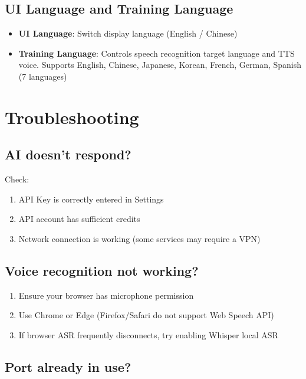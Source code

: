 \documentclass[12pt,a4paper]{article}
\begin{document}
\subsection{UI Language and Training Language}

\begin{itemize}[leftmargin=*]
  \item \textbf{UI Language}: Switch display language (English / Chinese)
  \item \textbf{Training Language}: Controls speech recognition target language and TTS voice. Supports English, Chinese, Japanese, Korean, French, German, Spanish (7 languages)
\end{itemize}

\newpage

\section{Troubleshooting}

\subsection{AI doesn't respond?}

Check:
\begin{enumerate}[leftmargin=*]
  \item API Key is correctly entered in Settings
  \item API account has sufficient credits
  \item Network connection is working (some services may require a VPN)
\end{enumerate}

\subsection{Voice recognition not working?}

\begin{enumerate}[leftmargin=*]
  \item Ensure your browser has microphone permission
  \item Use Chrome or Edge (Firefox/Safari do not support Web Speech API)
  \item If browser ASR frequently disconnects, try enabling Whisper local ASR
\end{enumerate}

\subsection{Port already in use?}
\end{document}
